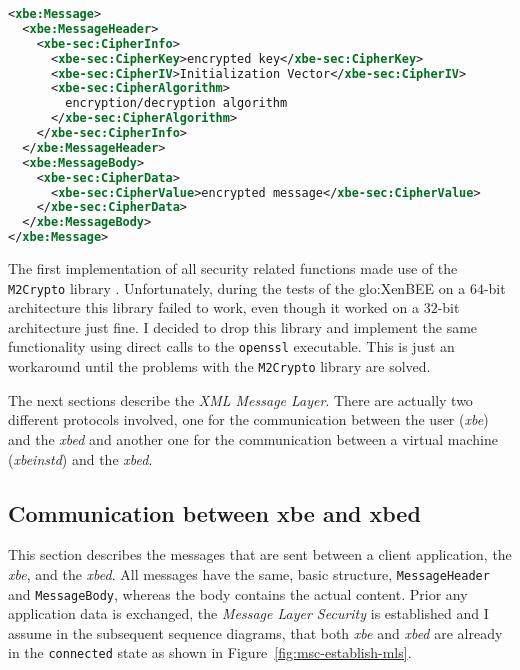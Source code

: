 \medskip
\begin{center}
  \begin{minipage}{.9\textwidth}
    \begin{lstlisting}[captionpos=b,backgroundcolor=\color{listingcolor},frame=lines,numbers=none,stepnumber=5,numberfirstline=false,numberstyle=\tiny,caption={The
        skeleton of an encrypted message.},label={lst:encrypted-message-skeleton},language=XML]
<xbe:Message>
  <xbe:MessageHeader>
    <xbe-sec:CipherInfo>
      <xbe-sec:CipherKey>encrypted key</xbe-sec:CipherKey>
      <xbe-sec:CipherIV>Initialization Vector</xbe-sec:CipherIV>
      <xbe-sec:CipherAlgorithm>
        encryption/decryption algorithm
      </xbe-sec:CipherAlgorithm>
    </xbe-sec:CipherInfo>
  </xbe:MessageHeader>
  <xbe:MessageBody>
    <xbe-sec:CipherData>
      <xbe-sec:CipherValue>encrypted message</xbe-sec:CipherValue>
    </xbe-sec:CipherData>
  </xbe:MessageBody>
</xbe:Message>
    \end{lstlisting}
  \end{minipage}
\end{center}

\medskip

The first implementation of all security related functions made use of the
\texttt{M2Crypto}  library  \cite{m2crypto}.   Unfortunately,  during  the
tests  of the  \gls{glo:XenBEE} on  a $64$-bit  architecture  this library
failed  to work, even  though it  worked on  a $32$-bit  architecture just
fine. I decided to drop  this library and implement the same functionality
using direct  calls to the  \texttt{openssl} executable.  This is  just an
workaround  until  the problems  with  the  \texttt{M2Crypto} library  are
solved.

\bigskip

The  next  sections describe  the  \emph{XML  Message  Layer}.  There  are
actually  two  different protocols  involved,  one  for the  communication
between the user (\emph{xbe}) and  the \emph{xbed} and another one for the
communication  between   a  virtual  machine   (\emph{xbeinstd})  and  the
\emph{xbed}.

\subsection{Communication between xbe and xbed}

This  section  describes the  messages  that  are  sent between  a  client
application, \ie  the \emph{xbe}, and  the \emph{xbed}. All  messages have
the    same,    basic    structure,   \ie    \texttt{MessageHeader}    and
\texttt{MessageBody}, whereas the body  contains the actual content. Prior
any application  data is exchanged,  the \emph{Message Layer  Security} is
established and  I assume in  the subsequent sequence diagrams,  that both
\emph{xbe} and \emph{xbed} are  already in the \texttt{connected} state as
shown in Figure~\ref{fig:msc-establish-mls}.


